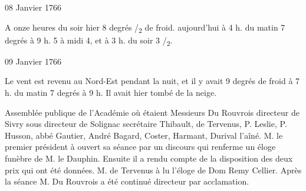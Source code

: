                      \begin{diary}{08 Janvier 1766}{}

                         A onze heures du soir hier
                           8 degrés
                              /\textsubscript{2} de
                              froid. aujourd'hui à 4 h. du matin
                           7 degrés à 9 h.
                           5 à midi
                              4, et à
                           3 h. du
                              soir
                           3 /\textsubscript{2}.
                        \bigskip


                     \end{diary}

                     \begin{diary}{09 Janvier 1766}{}

                         Le vent est revenu au Nord-Est pendant
                           la
                           nuit, et il y avait 9 degrés de
                              froid à
                           7 h. du
                              matin
                           7 degrés à 9 h. Il avait
                           hier tombé de la neige. \bigskip


                         Assemblée publique de l'Académie où étaient
                           Messieurs
                           Du Rouvrois
                           directeur
                           de Sivry
                           sous directeur
                           de Solignac
                           secrétaire
                           Thibault, de Tervenus,
                           P. Leslie, P. Husson, abbé
                              Gautier, André
                           Bagard, Coster, Harmant,
                              Durival l'aîné.
                           M. le premier président à ouvert sa séance par
                           un discours qui renferme un éloge funèbre
                           de M. le Dauphin.
                           Ensuite il a rendu
                           compte de la disposition des deux prix
                           qui ont été données. M. de
                              Tervenus à
                           lu l'éloge de Dom Remy
                              Cellier. Après
                           la séance M. Du Rouvrois a
                           été continué
                           directeur par acclamation. \bigskip



\end{diary}
